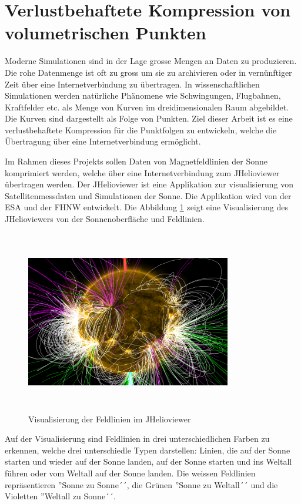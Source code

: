 \section{Verlustbehaftete Kompression von volumetrischen Punkten}\label{einleitung}
Moderne Simulationen sind in der Lage grosse Mengen an Daten zu produzieren. Die rohe Datenmenge ist oft zu gross um sie zu archivieren oder in vernünftiger Zeit über eine Internetverbindung zu übertragen. In wissenschaftlichen Simulationen werden natürliche Phänomene wie Schwingungen, Flugbahnen, Kraftfelder etc. als Menge von Kurven im dreidimensionalen Raum abgebildet. Die Kurven sind dargestellt als Folge von Punkten. Ziel dieser Arbeit ist es eine verlustbehaftete Kompression für die Punktfolgen zu entwickeln, welche die Übertragung über eine Internetverbindung ermöglicht.

Im Rahmen dieses Projekts sollen Daten von Magnetfeldlinien der Sonne komprimiert werden, welche über eine Internetverbindung zum JHelioviewer übertragen werden. Der JHelioviewer ist eine Applikation zur visualisierung von Satellitenmessdaten und Simulationen der Sonne. Die Applikation wird von der ESA und der FHNW entwickelt. Die Abbildung \ref{einleitung::feldlinien} zeigt eine Visualisierung des JHelioviewers von der Sonnenoberfläche und Feldlinien.\\
\begin{figure}[!htbp]
\center
	\includegraphics[width=0.8\textwidth,height=8cm,keepaspectratio]{./pictures/einleitung/fieldLines.png}
	\caption{Visualisierung der Feldlinien im JHelioviewer}
	\label{einleitung::feldlinien}
\end{figure}
Auf der Visualisierung sind Feldlinien in drei unterschiedlichen Farben zu erkennen, welche drei unterschiedle Typen darstellen: Linien, die auf der Sonne starten und wieder auf der Sonne landen, auf der Sonne starten und ins Weltall führen oder vom Weltall auf der Sonne landen. Die weissen Feldlinien repräsentieren ''Sonne zu Sonne´´, die Grünen ''Sonne zu Weltall´´ und die Violetten ''Weltall zu Sonne´´.

